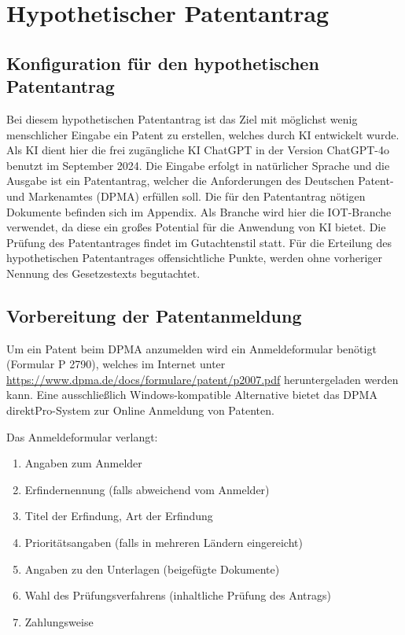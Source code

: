 \chapter{Hypothetischer Patentantrag\label{cha:chapter5}}

\section{Konfiguration für den hypothetischen Patentantrag}

Bei diesem hypothetischen Patentantrag ist das Ziel mit möglichst
wenig menschlicher Eingabe ein Patent zu erstellen,
welches durch KI entwickelt wurde.
Als KI dient hier die frei zugängliche KI ChatGPT in der Version
ChatGPT-4o benutzt im September 2024.
Die Eingabe erfolgt in natürlicher Sprache und die Ausgabe
ist ein Patentantrag, welcher die Anforderungen des Deutschen
Patent- und Markenamtes (DPMA) erfüllen soll. 
Die für den Patentantrag nötigen Dokumente befinden sich im Appendix.
Als Branche wird hier die IOT-Branche verwendet, 
da diese ein großes Potential für die Anwendung von KI bietet.
Die Prüfung des Patentantrages findet im Gutachtenstil statt.
Für die Erteilung des hypothetischen Patentantrages offensichtliche
Punkte, werden ohne vorheriger Nennung des Gesetzestexts begutachtet.
\section{Vorbereitung der Patentanmeldung}

Um ein Patent beim DPMA anzumelden wird ein Anmeldeformular benötigt (Formular P 2790),
welches im Internet unter \url{https://www.dpma.de/docs/formulare/patent/p2007.pdf} heruntergeladen
werden kann. 
Eine ausschließlich Windows-kompatible Alternative bietet
das DPMA direktPro-System zur Online Anmeldung von Patenten.

Das Anmeldeformular verlangt:

\begin{enumerate}
    \item Angaben zum Anmelder
    \item Erfindernennung (falls abweichend vom Anmelder)
    \item Titel der Erfindung, Art der Erfindung
    \item Prioritätsangaben (falls in mehreren Ländern eingereicht)
    \item Angaben zu den Unterlagen (beigefügte Dokumente)
    \item Wahl des Prüfungsverfahrens (inhaltliche Prüfung des Antrags)
	\item Zahlungsweise
\end{enumerate}

